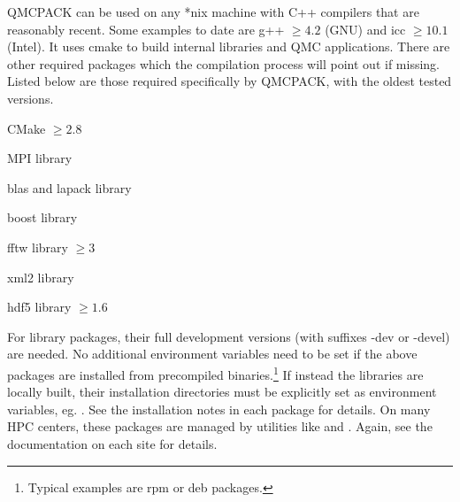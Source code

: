 QMCPACK can be used on any *nix machine with C++ compilers that are reasonably
recent.  Some examples to date are g++ $\geq 4.2$ (GNU) and icc $\geq 10.1$
(Intel).  It uses cmake to build internal libraries and QMC applications.
There are other required packages which the compilation process will
point out if missing.  Listed below are those required specifically by QMCPACK,
with the oldest tested versions.
\begin{itemize*}
\item{} CMake $\geq 2.8$
\item{} MPI library
\item{} blas and lapack library
\item{} boost library
\item{} fftw library $\geq 3$
\item{} xml2 library
\item{} hdf5 library $\geq 1.6$
\end{itemize*}
For library packages, their full development versions (with suffixes -dev or
-devel) are needed.  No additional environment variables need to be set if the
above packages are installed from precompiled binaries.\footnote{Typical
examples are rpm or deb packages.}  If instead the libraries are locally built,
their installation directories must be explicitly set as environment variables,
eg. .  See the installation notes in each
package for details.  On many HPC centers, these packages are managed by
utilities like  and .  Again, see the
documentation on each site for details.

